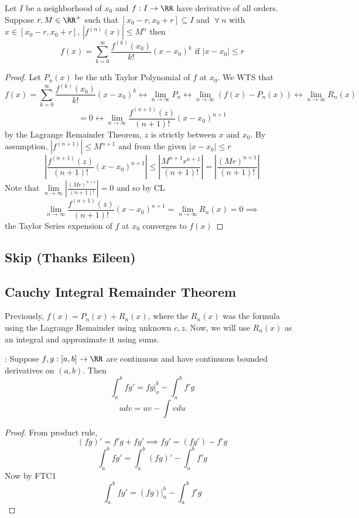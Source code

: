 \documentclass[12pt]{scrartcl}
\begin{document}
\begin{theorem}
  Let $I$ be a neighborhood of $x_0$ and $f: I \to \RR$ have derivative of all orders. 
  Suppose $r, M \in \RR^+$ such that $[x_0 -r, x_0 + r] \subseteq I$ and $\ \forall \ n$ with $x \in [x_0 - r, x_0 + r]$, 
  $|f^{(n)} (x)| \leq M^n$ then 
  \[f(x) = \sum_{k=0}^\infty \frac{f^{(k)}(x_0)}{k!}(x-x_0)^k \text{ if } |x-x_0| \leq r\]

  \begin{proof}
    Let $P_n(x)$ be the nth Taylor Polynomial of $f$ at $x_0$. We WTS that
    \[f(x) = \sum_{k=0}^\infty \frac{f^{(k)}(x_0)}{k!}(x-x_0)^k \leftrightarrow \lim_{n\to\infty}P_n \leftrightarrow \lim_{n\to\infty}(f(x) - P_n(x)) \leftrightarrow \lim_{n\to\infty}R_n(x)\]
    \[ = 0 \leftrightarrow \lim_{n\to\infty}\frac{f^{(n+1)}(z)}{(n+1)!}(x-x_0)^{n+1}\]
    by the Lagrange Remainder Theorem, $z$ is strictly between $x$ and $x_0$. 
    By assumption, $|f^{(n+1)}| \leq M^{n+1}$ and from the given 
    $|x-x_0| \leq r$
    \[\left| \frac{f^{(n+1)}(z)}{(n+1)!}(x-x_0)^{n+1} \right| \leq \left| \frac{M^{n+1}r^{n+1}}{(n+1)!}\right| = \left| \frac{(Mr)^{n+1}}{(n+1)!} \right|\]
    Note that $\underset{n\to\infty}{\lim}\left|\frac{(Mr)^{n+1}}{(n+1)!}\right| = 0$ and so by CL
    \[\lim_{n\to\infty}\frac{f^{(n+1)}(z)}{(n+1)!}(x-x_0)^{n+1} = \lim_{n\to\infty}R_n(x) = 0 \implies \]
    the Taylor Series expension of $f$ at $x_0$ converges to $f(x)$
  \end{proof}
\end{theorem}

\subsection{Skip (Thanks Eileen)}

\subsection{Cauchy Integral Remainder Theorem}

Previously, $f(x) = P_n(x) + R_n(x)$, where the $R_n(x)$ was the formula using the Lagrange Remainder using unknown $c, z$. 
Now, we will use $R_n(x)$ as an integral and approximate it using sums.

\begin{theorem}
  : Suppose $f, g: [a,b] \to \RR$
  are continuous and have continuous bounded derivatives on $(a,b)$. Then 
  \[\int_a^b fg' = fg|_a^b - \int_a^b f'g\]
  \[u dv = uv - \int vdu\]
  \begin{proof}
    From product rule, 
    \[(fg)' = f'g + fg' \implies fg' = (fg') - f'g\]
    \[\int_a^b fg' = \int_a^b (fg)' - \int_a^b f'g\]
    Now by FTC1
    \[\int_a^b fg' = (fg)|_a^b - \int_a^b f'g\]
  \end{proof}
\end{theorem}
\end{document}
